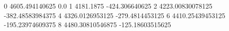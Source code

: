 0 4605.494140625 0.0
1 4181.1875 -424.306640625
2 4223.00830078125 -382.48583984375
4 4326.0126953125 -279.4814453125
6 4410.25439453125 -195.23974609375
8 4480.30810546875 -125.18603515625
